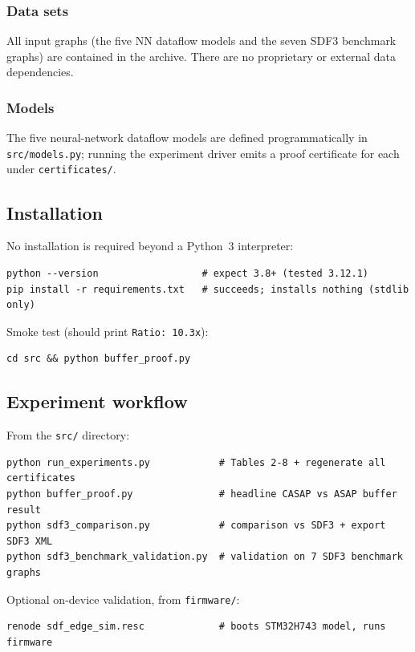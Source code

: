 \documentclass[10pt]{article}
\begin{document}
\subsubsection{Data sets}
All input graphs (the five NN dataflow models and the seven SDF3 benchmark
graphs) are contained in the archive. There are no proprietary or external data
dependencies.

\subsubsection{Models}
The five neural-network dataflow models are defined programmatically in
\texttt{src/models.py}; running the experiment driver emits a proof certificate
for each under \texttt{certificates/}.

\subsection{Installation}
No installation is required beyond a Python~3 interpreter:
\begin{verbatim}
python --version                  # expect 3.8+ (tested 3.12.1)
pip install -r requirements.txt   # succeeds; installs nothing (stdlib only)
\end{verbatim}
Smoke test (should print \texttt{Ratio: 10.3x}):
\begin{verbatim}
cd src && python buffer_proof.py
\end{verbatim}

\subsection{Experiment workflow}
From the \texttt{src/} directory:
\begin{verbatim}
python run_experiments.py            # Tables 2-8 + regenerate all certificates
python buffer_proof.py               # headline CASAP vs ASAP buffer result
python sdf3_comparison.py            # comparison vs SDF3 + export SDF3 XML
python sdf3_benchmark_validation.py  # validation on 7 SDF3 benchmark graphs
\end{verbatim}
Optional on-device validation, from \texttt{firmware/}:
\begin{verbatim}
renode sdf_edge_sim.resc             # boots STM32H743 model, runs firmware
\end{verbatim}
\end{document}
